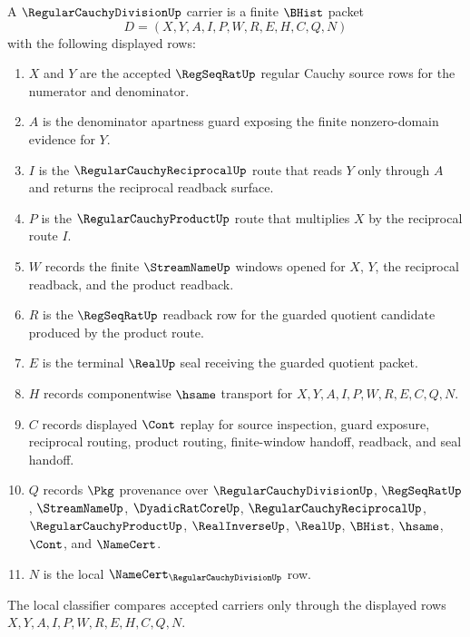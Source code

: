 \begin{definition}
\label{def:regular-cauchy-division-carrier}
A $\RegularCauchyDivisionUp$ carrier is a finite $\BHist$ packet
$$
D=(X,Y,A,I,P,W,R,E,H,C,Q,N)
$$
with the following displayed rows:
\begin{enumerate}
\item $X$ and $Y$ are the accepted $\RegSeqRatUp$ regular Cauchy source rows for the numerator and denominator.
\item $A$ is the denominator apartness guard exposing the finite nonzero-domain evidence for $Y$.
\item $I$ is the $\RegularCauchyReciprocalUp$ route that reads $Y$ only through $A$ and returns the reciprocal readback surface.
\item $P$ is the $\RegularCauchyProductUp$ route that multiplies $X$ by the reciprocal route $I$.
\item $W$ records the finite $\StreamNameUp$ windows opened for $X$, $Y$, the reciprocal readback, and the product readback.
\item $R$ is the $\RegSeqRatUp$ readback row for the guarded quotient candidate produced by the product route.
\item $E$ is the terminal $\RealUp$ seal receiving the guarded quotient packet.
\item $H$ records componentwise $\hsame$ transport for $X,Y,A,I,P,W,R,E,C,Q,N$.
\item $C$ records displayed $\Cont$ replay for source inspection, guard exposure, reciprocal routing, product routing, finite-window handoff, readback, and seal handoff.
\item $Q$ records $\Pkg$ provenance over $\RegularCauchyDivisionUp$, $\RegSeqRatUp$, $\StreamNameUp$, $\DyadicRatCoreUp$, $\RegularCauchyReciprocalUp$, $\RegularCauchyProductUp$, $\RealInverseUp$, $\RealUp$, $\BHist$, $\hsame$, $\Cont$, and $\NameCert$.
\item $N$ is the local $\NameCert_{\RegularCauchyDivisionUp}$ row.
\end{enumerate}
The local classifier compares accepted carriers only through the displayed rows $X,Y,A,I,P,W,R,E,H,C,Q,N$.
\end{definition}

